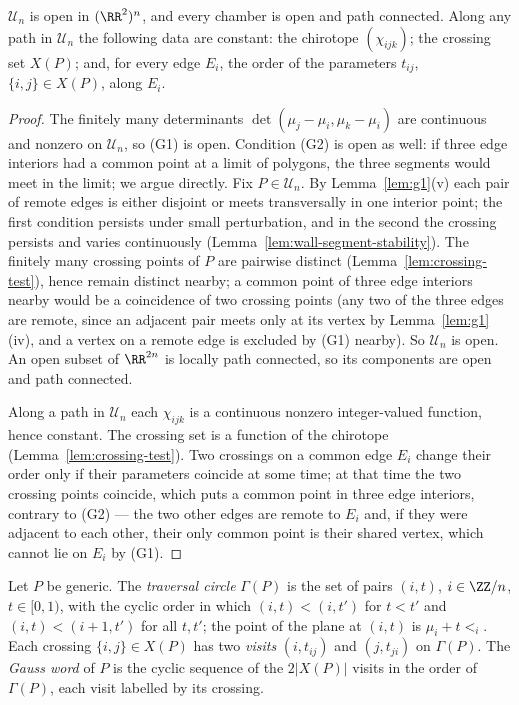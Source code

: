 \begin{proposition}[chambers]\label{prop:chambers}\leanok
$\mathcal U_n$ is open in $(\RR^2)^n$, and every chamber is open and path
connected. Along any path in $\mathcal U_n$ the following data are constant:
the chirotope $(\chi_{ijk})$; the crossing set $X(P)$; and, for every edge
$E_i$, the order of the parameters $t_{ij}$, $\{i,j\}\in X(P)$, along $E_i$.

\end{proposition}
\begin{proof}\leanok{}
The finitely many determinants $\det(\mu_j-\mu_i,\mu_k-\mu_i)$ are continuous
and nonzero on $\mathcal U_n$, so (G1) is open. Condition (G2) is open as well:
if three edge interiors had a common point at a limit of polygons, the three
segments would meet in the limit; we argue directly. Fix $P\in\mathcal U_n$.
By Lemma~\ref{lem:g1}(v) each pair of remote edges is either disjoint or
meets transversally in one interior point; the first condition persists under
small perturbation, and in the second the crossing persists and varies
continuously (Lemma~\ref{lem:wall-segment-stability}).
The finitely many crossing points of $P$ are pairwise distinct
(Lemma~\ref{lem:crossing-test}), hence remain distinct nearby; a common point
of three edge interiors nearby would be a coincidence of two crossing points
(any two of the three edges are remote, since an adjacent pair meets only at
its vertex by Lemma~\ref{lem:g1}(iv), and a vertex on a remote edge is excluded
by (G1) nearby). So $\mathcal U_n$ is open. An open subset of $\RR^{2n}$ is
locally path connected, so its components are open and path connected.

Along a path in $\mathcal U_n$ each $\chi_{ijk}$ is a continuous nonzero
integer-valued function, hence constant. The crossing set is a function of the
chirotope (Lemma~\ref{lem:crossing-test}). Two crossings on a common edge $E_i$
change their order only if their parameters coincide at some time; at that
time the two crossing points coincide, which puts a common point in three edge
interiors, contrary to (G2) --- the two other edges are remote to $E_i$ and,
if they were adjacent to each other, their only common point is their shared
vertex, which cannot lie on $E_i$ by (G1).
\end{proof}

\begin{definition}\label{def:gauss}\leanok
Let $P$ be generic. The \emph{traversal circle} $\Gamma(P)$ is the set of
pairs $(i,t)$, $i\in\ZZ/n$, $t\in[0,1)$, with the cyclic order in which
$(i,t)<(i,t')$ for $t<t'$ and $(i,t)<(i+1,t')$ for all $t,t'$; the point of
the plane at $(i,t)$ is $\mu_i+t\lt_i$. Each crossing $\{i,j\}\in X(P)$ has
two \emph{visits} $(i,t_{ij})$ and $(j,t_{ji})$ on $\Gamma(P)$. The
\emph{Gauss word} of $P$ is the cyclic sequence of the $2|X(P)|$ visits in
the order of $\Gamma(P)$, each visit labelled by its crossing.
\end{definition}

